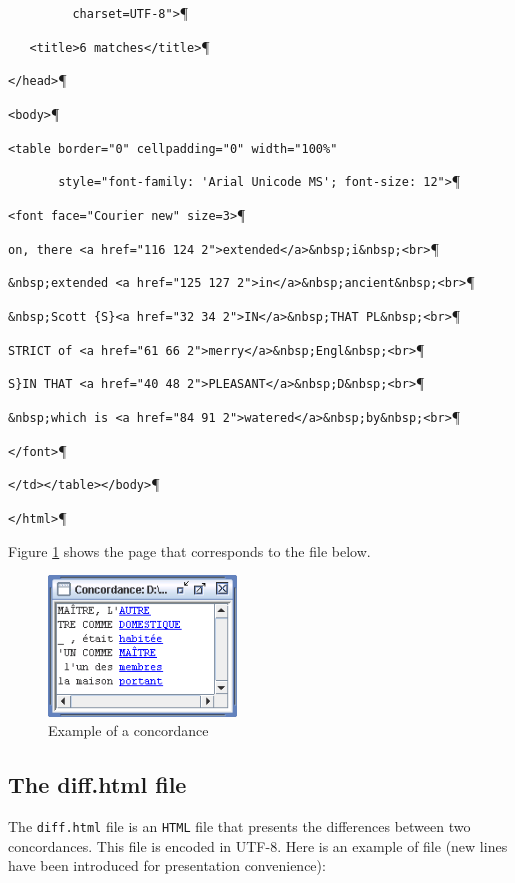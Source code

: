 \verb$         charset=UTF-8">$\P

\verb$   <title>6 matches</title>$\P

\verb$</head>$\P

\verb$<body>$\P

\verb$<table border="0" cellpadding="0" width="100%" $

\verb$       style="font-family: 'Arial Unicode MS'; font-size: 12">$\P

\verb$<font face="Courier new" size=3>$\P

\verb$on, there <a href="116 124 2">extended</a>&nbsp;i&nbsp;<br>$\P

\verb$&nbsp;extended <a href="125 127 2">in</a>&nbsp;ancient&nbsp;<br>$\P

\verb$&nbsp;Scott {S}<a href="32 34 2">IN</a>&nbsp;THAT PL&nbsp;<br>$\P

\verb$STRICT of <a href="61 66 2">merry</a>&nbsp;Engl&nbsp;<br>$\P

\verb+S}IN THAT <a href="40 48 2">PLEASANT</a>&nbsp;D&nbsp;<br>+\P

\verb+&nbsp;which is <a href="84 91 2">watered</a>&nbsp;by&nbsp;<br>+\P

\verb$</font>$\P

\verb$</td></table></body>$\P

\verb$</html>$\P


\bigskip
\noindent Figure \ref{fig-example-concordance-2} shows the page that
corresponds to the file below.

\begin{figure}[!h]
\begin{center}
\includegraphics[width=5cm]{resources/img/fig10-2.png}
\caption{Example of a concordance\label{fig-example-concordance-2}}
\end{center}
\end{figure}



\subsection{The diff.html file}
The \verb+diff.html+ file is an \verb+HTML+ file that presents the differences
between two concordances. This file is encoded in UTF-8. Here is an
example of file (new lines have been introduced for presentation convenience):


